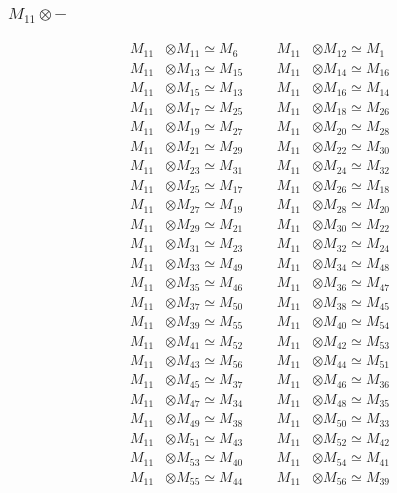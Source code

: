 \subsubsection{$ M_{11}\otimes -$}
\begin{align*}
M_{11} &\otimes M_{11} \simeq M_{6} &&& M_{11} &\otimes M_{12} \simeq M_{1}\\
M_{11} &\otimes M_{13} \simeq M_{15} &&& M_{11} &\otimes M_{14} \simeq M_{16}\\
M_{11} &\otimes M_{15} \simeq M_{13} &&& M_{11} &\otimes M_{16} \simeq M_{14}\\
M_{11} &\otimes M_{17} \simeq M_{25} &&& M_{11} &\otimes M_{18} \simeq M_{26}\\
M_{11} &\otimes M_{19} \simeq M_{27} &&& M_{11} &\otimes M_{20} \simeq M_{28}\\
M_{11} &\otimes M_{21} \simeq M_{29} &&& M_{11} &\otimes M_{22} \simeq M_{30}\\
M_{11} &\otimes M_{23} \simeq M_{31} &&& M_{11} &\otimes M_{24} \simeq M_{32}\\
M_{11} &\otimes M_{25} \simeq M_{17} &&& M_{11} &\otimes M_{26} \simeq M_{18}\\
M_{11} &\otimes M_{27} \simeq M_{19} &&& M_{11} &\otimes M_{28} \simeq M_{20}\\
M_{11} &\otimes M_{29} \simeq M_{21} &&& M_{11} &\otimes M_{30} \simeq M_{22}\\
M_{11} &\otimes M_{31} \simeq M_{23} &&& M_{11} &\otimes M_{32} \simeq M_{24}\\
M_{11} &\otimes M_{33} \simeq M_{49} &&& M_{11} &\otimes M_{34} \simeq M_{48}\\
M_{11} &\otimes M_{35} \simeq M_{46} &&& M_{11} &\otimes M_{36} \simeq M_{47}\\
M_{11} &\otimes M_{37} \simeq M_{50} &&& M_{11} &\otimes M_{38} \simeq M_{45}\\
M_{11} &\otimes M_{39} \simeq M_{55} &&& M_{11} &\otimes M_{40} \simeq M_{54}\\
M_{11} &\otimes M_{41} \simeq M_{52} &&& M_{11} &\otimes M_{42} \simeq M_{53}\\
M_{11} &\otimes M_{43} \simeq M_{56} &&& M_{11} &\otimes M_{44} \simeq M_{51}\\
M_{11} &\otimes M_{45} \simeq M_{37} &&& M_{11} &\otimes M_{46} \simeq M_{36}\\
M_{11} &\otimes M_{47} \simeq M_{34} &&& M_{11} &\otimes M_{48} \simeq M_{35}\\
M_{11} &\otimes M_{49} \simeq M_{38} &&& M_{11} &\otimes M_{50} \simeq M_{33}\\
M_{11} &\otimes M_{51} \simeq M_{43} &&& M_{11} &\otimes M_{52} \simeq M_{42}\\
M_{11} &\otimes M_{53} \simeq M_{40} &&& M_{11} &\otimes M_{54} \simeq M_{41}\\
M_{11} &\otimes M_{55} \simeq M_{44} &&& M_{11} &\otimes M_{56} \simeq M_{39}\\
\end{align*}

